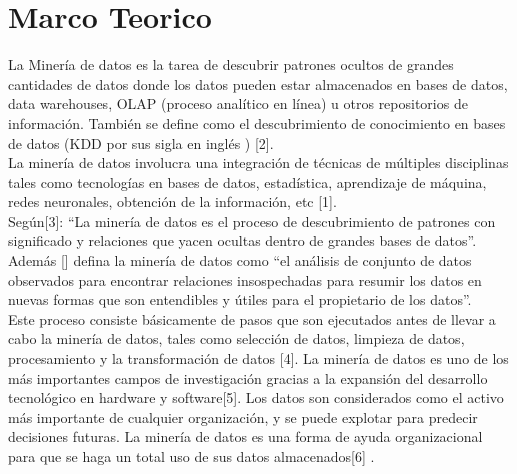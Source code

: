 \section{Marco Teorico}

La Minería de datos es la tarea de descubrir patrones ocultos de grandes cantidades de datos donde los datos pueden estar almacenados en bases de datos, data warehouses, OLAP (proceso analítico en línea) u otros repositorios de información. También se define como el descubrimiento de conocimiento en bases de datos (KDD por sus sigla en inglés ) [2]. \\
La minería de datos involucra una integración de técnicas de múltiples disciplinas tales como tecnologías en bases de datos, estadística, aprendizaje de máquina, redes neuronales, obtención de la información, etc [1].\\
Según[3]: “La minería de datos es el proceso de descubrimiento de patrones con significado y relaciones que yacen ocultas dentro de grandes bases de datos”. Además [] defina la minería de datos como “el análisis de conjunto de datos observados para encontrar relaciones insospechadas para resumir los datos en nuevas formas que son entendibles y útiles para el propietario de los datos”.\\
Este proceso consiste básicamente de pasos que son ejecutados antes de llevar a cabo la minería de datos, tales como selección de datos, limpieza de datos, procesamiento y la transformación de datos [4].
La minería de datos es uno de los más importantes campos de investigación gracias a la expansión del desarrollo tecnológico en hardware y software[5]. Los datos son considerados como el activo más importante de cualquier organización, y se puede explotar para predecir decisiones futuras. La minería de datos es una forma de ayuda organizacional para que se haga un total uso de sus datos almacenados[6] .\\

